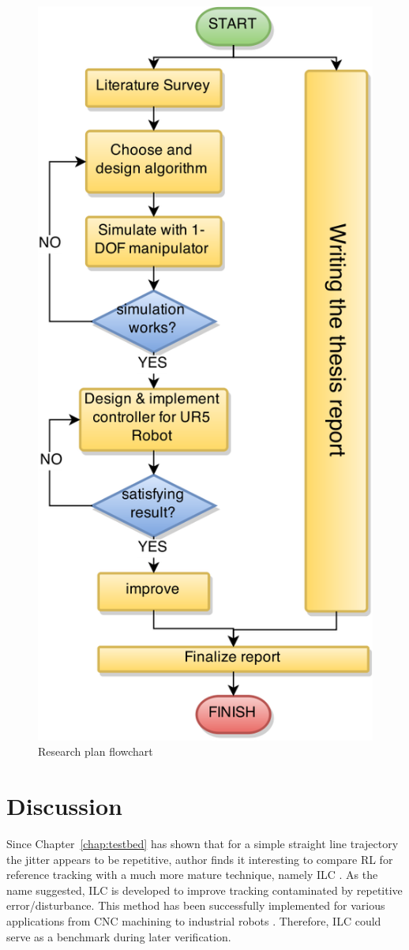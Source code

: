 \begin{figure}
\centering
\includegraphics[width=0.5\linewidth]{Drawing1}
\caption{Research plan flowchart}
\label{fig:flowchart}
\end{figure}

\section{Discussion}\label{sec:discussion}
Since Chapter~\ref{chap:testbed} has shown that for a simple straight line trajectory the jitter appears to be repetitive, author finds it interesting to compare \ac{RL} for reference tracking with a much more mature technique, namely \ac{ILC} \cite{4048052}. As the name suggested, \ac {ILC} is developed to improve tracking contaminated by repetitive error/disturbance. This method has been successfully implemented for various applications from CNC machining \cite{299157} to industrial robots \cite{1044377}. Therefore, \ac {ILC} could serve as a benchmark during later verification.
